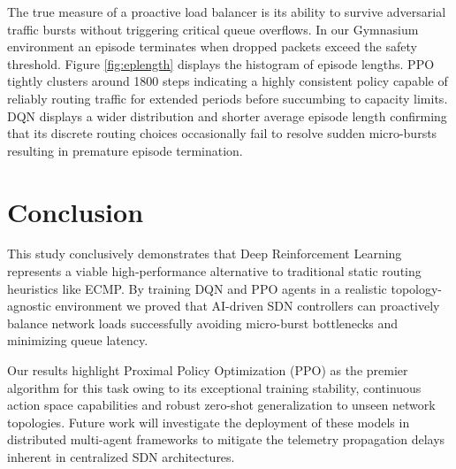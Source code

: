 \documentclass[10pt,twocolumn,letterpaper]{article}
\begin{document}
The true measure of a proactive load balancer is its ability to survive adversarial traffic bursts without triggering critical queue overflows. In our Gymnasium environment an episode terminates when dropped packets exceed the safety threshold. Figure \ref{fig:eplength} displays the histogram of episode lengths. PPO tightly clusters around 1800 steps indicating a highly consistent policy capable of reliably routing traffic for extended periods before succumbing to capacity limits. DQN displays a wider distribution and shorter average episode length confirming that its discrete routing choices occasionally fail to resolve sudden micro-bursts resulting in premature episode termination.

\section{Conclusion}
This study conclusively demonstrates that Deep Reinforcement Learning represents a viable high-performance alternative to traditional static routing heuristics like ECMP. By training DQN and PPO agents in a realistic topology-agnostic environment we proved that AI-driven SDN controllers can proactively balance network loads successfully avoiding micro-burst bottlenecks and minimizing queue latency.

Our results highlight Proximal Policy Optimization (PPO) as the premier algorithm for this task owing to its exceptional training stability, continuous action space capabilities and robust zero-shot generalization to unseen network topologies. Future work will investigate the deployment of these models in distributed multi-agent frameworks to mitigate the telemetry propagation delays inherent in centralized SDN architectures.

{\small


}
\end{document}
